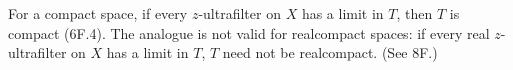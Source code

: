For a compact space, if every $z$-ultrafilter on $X$ has a limit in $T$, then $T$ is compact (6F.4). The analogue is not valid for realcompact spaces: if every real $z$-ultrafilter on $X$ has a limit in $T$, $T$ need not be realcompact. (See 8F.)
